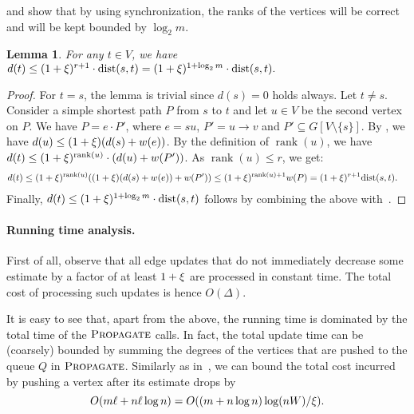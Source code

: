 \documentclass[11pt,letterpaper]{article}
\theoremstyle{plain}
\newtheorem{lemma}[theorem]{Lemma}
\renewcommand{\O}{O}
\newcommand{\dist}{\mathrm{dist}}
\newcommand{\wei}{w}
\DeclareMathOperator*{\rank}{rank}
\DeclareMathOperator*{\PD}{\textsc{Propagate}}
\begin{document}
 and  show that by using synchronization, the ranks of the vertices will be correct and will be kept bounded by $\log_2 m$.
\begin{lemma}\label{l:rank}
For any $t\in V$, we have
$ d(t)\leq (1+\epsp)^{r+1}\cdot \dist(s,t)=(1+\epsp)^{1+\log_2{m}}\cdot \dist(s,t).$
\end{lemma}
\begin{proof}
For $t=s$, the lemma is trivial since $d(s)=0$ holds always.
Let $t\neq s$.
Consider a simple shortest path $P$ from $s$ to $t$ and let $u \in V$ be the second vertex on $P$.
We have $P=e\cdot P'$, where $e=su$, $P'=u\to v$ and $P'\subseteq G[V\setminus \{s\}]$.
By , we have ${d(u)\leq (1+\epsp)(d(s)+\wei(e))}$.
By the definition of $\rank(u)$, we have $d(t)\leq (1+\epsp)^{\rank(u)}\cdot (d(u)+\wei(P'))$.
As $\rank(u)\leq r$, we get:
\begin{align*}
  d(t)&\leq (1+\epsp)^{\rank(u)} ((1+\epsp)(d(s)+\wei(e))+\wei(P'))
  \leq (1+\epsp)^{\rank(u)+1}\wei(P)
  =(1+\epsp)^{r+1}\dist(s,t).
\end{align*}
Finally, $d(t)\leq (1+\epsp)^{1+\log_2{m}}\cdot\dist(s,t)$ follows by combining the above with~.
\end{proof}

\paragraph{Running time analysis.} 
First of all, observe that all edge updates that do not immediately
decrease some estimate by a factor of at least $1+\xi$ are processed in constant time.
The total cost of processing such updates is hence $\O(\Delta)$.

It is easy to see that, apart from the above, the running time is dominated by the total time of the $\PD$ calls. 
In fact, the total update time can be (coarsely) bounded by summing the degrees of the vertices that are pushed to the queue $Q$ in $\PD$.
Similarly as in~, we can bound the total cost incurred by pushing a vertex after its estimate drops by
\[ \O(m\ell+n\ell\log{n})=\O((m+n\log{n})\log(nW)/\epsp).\]
\end{document}
